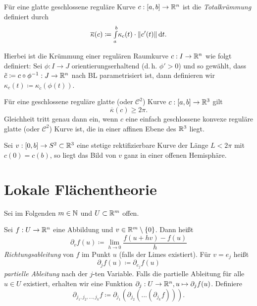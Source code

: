 \documentclass{cheat-sheet}
\newcommand{\Intabdt}[1]{\Int{a}{b}{#1}{t}}
\begin{document}

\begin{defn}
  Für eine glatte geschlossene reguläre Kurve $c : [a, b] \to \mathbb{R}^n$ ist die \emph{Totalkrümmung} definiert durch
  \[ \overline\kappa(c) \coloneqq \Intabdt{\kappa_c(t) \cdot \| c'(t) \|}. \]

  Hierbei ist die Krümmung einer regulären Raumkurve $c : I \to \mathbb{R}^n$ wie folgt definiert:
  Sei $\phi : I \to J$ orientierungserhaltend
  (d.\,h. $\phi' > 0$) und so gewählt,
  dass $\tilde{c} \coloneqq c \circ \phi^{-1} : J \to \mathbb{R}^n$ nach
  BL parametrisiert ist, dann definieren wir $\kappa_c(t) \coloneqq \kappa_{\tilde{c}}(\phi(t))$.
\end{defn}

\begin{satz}[Fenchel]
  Für eine geschlossene reguläre glatte (oder $\mathcal{C}^2$) Kurve $c : [a, b] \to \mathbb{R}^3$ gilt
  \[ \overline\kappa(c) \geq 2 \pi. \]
  Gleichheit tritt genau dann ein, wenn $c$ eine einfach geschlossene konvexe reguläre glatte (oder $\mathcal{C}^2$) Kurve ist, die in einer affinen Ebene des $\mathbb{R}^3$ liegt.
\end{satz}

\begin{satz}
  Sei $v : [0, b] \to S^2 \subset \mathbb{R}^3$ eine stetige rektifizierbare Kurve der Länge $L < 2 \pi$
mit $c(0) = c(b)$, so liegt das Bild von $v$ ganz in einer offenen Hemisphäre.
\end{satz}


\section{Lokale Flächentheorie}

\begin{nota}
  Sei im Folgenden $m \in \mathbb{N}$ und $U \subset \mathbb{R}^m$ offen.
\end{nota}

\begin{defn}
  Sei $f : U \to \mathbb{R}^n$ eine Abbildung und $v \in \mathbb{R}^m \setminus \{ 0 \}$. Dann heißt
  \[ \partial_v f(u) \coloneqq \lim_{h \to 0} \frac{f(u + hv) - f(u)}{ h } \]
  \emph{Richtungsableitung} von $f$ im Punkt $u$ (falls der Limes existiert). Für $v = e_j$ heißt
  \[ \partial_j f(u) \coloneqq \partial_{e_j} f(u) \]
  \emph{partielle Ableitung} nach der $j$-ten Variable. Falls die partielle Ableitung für alle $u \in U$ existiert, erhalten wir eine Funktion $\partial_j : U \to \mathbb{R}^n, u \mapsto \partial_j f(u)$. Definiere
  \[ \partial_{j_1, j_2, ..., j_k} f \coloneqq \partial_{j_1} ( \partial_{j_2} ( ... ( \partial_{j_k} f) ) ). \]
\end{defn}
\end{document}
